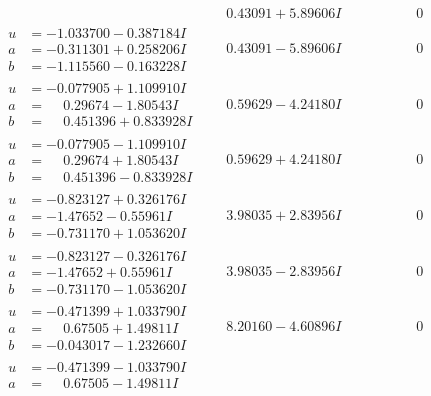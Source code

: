 \documentclass[1p]{elsarticle_modified}
\theoremstyle{definition}
\begin{document}
$$\begin{array}{c|c|c}
 & \phantom{-}0.43091 + 5.89606 I & \phantom{-0.000000 } 0 \\ \hline\begin{aligned}
u &= -1.033700 - 0.387184 I \\
a &= -0.311301 + 0.258206 I \\
b &= -1.115560 - 0.163228 I\end{aligned}
 & \phantom{-}0.43091 - 5.89606 I & \phantom{-0.000000 } 0 \\ \hline\begin{aligned}
u &= -0.077905 + 1.109910 I \\
a &= \phantom{-}0.29674 - 1.80543 I \\
b &= \phantom{-}0.451396 + 0.833928 I\end{aligned}
 & \phantom{-}0.59629 - 4.24180 I & \phantom{-0.000000 } 0 \\ \hline\begin{aligned}
u &= -0.077905 - 1.109910 I \\
a &= \phantom{-}0.29674 + 1.80543 I \\
b &= \phantom{-}0.451396 - 0.833928 I\end{aligned}
 & \phantom{-}0.59629 + 4.24180 I & \phantom{-0.000000 } 0 \\ \hline\begin{aligned}
u &= -0.823127 + 0.326176 I \\
a &= -1.47652 - 0.55961 I \\
b &= -0.731170 + 1.053620 I\end{aligned}
 & \phantom{-}3.98035 + 2.83956 I & \phantom{-0.000000 } 0 \\ \hline\begin{aligned}
u &= -0.823127 - 0.326176 I \\
a &= -1.47652 + 0.55961 I \\
b &= -0.731170 - 1.053620 I\end{aligned}
 & \phantom{-}3.98035 - 2.83956 I & \phantom{-0.000000 } 0 \\ \hline\begin{aligned}
u &= -0.471399 + 1.033790 I \\
a &= \phantom{-}0.67505 + 1.49811 I \\
b &= -0.043017 - 1.232660 I\end{aligned}
 & \phantom{-}8.20160 - 4.60896 I & \phantom{-0.000000 } 0 \\ \hline\begin{aligned}
u &= -0.471399 - 1.033790 I \\
a &= \phantom{-}0.67505 - 1.49811 I \\

\end{aligned}
\end{array}$$
\end{document}
